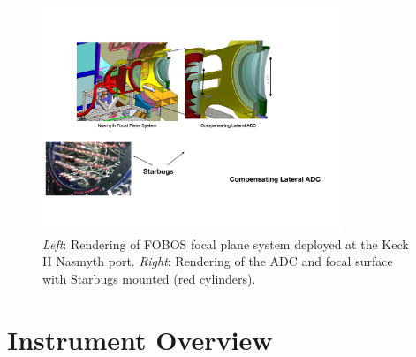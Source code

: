 
\begin{figure}[h!]
\includegraphics[width=0.8\textwidth]{figs/FOBOS_FocalPlane_v2.pdf}
\caption{\small {\it
Left}: Rendering of FOBOS focal plane system deployed at the Keck II
Nasmyth port. {\it Right}: Rendering of the ADC and focal surface with
Starbugs mounted (red cylinders).}
\label{fig:focalplane}
\end{figure}

\section{Instrument Overview}
\label{sec:concept}



